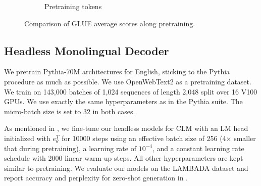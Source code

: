 \begin{figure}
\begin{subfigure}[b]{0.48\columnwidth}
         \caption{Pretraining tokens}
         \label{fig:bert_compare_tokens}
    \end{subfigure}
    \caption{Comparison of GLUE average scores along pretraining.}
    \label{fig:train_curve_mlm}
\end{figure}



\subsection{Headless Monolingual Decoder}
\label{sec:mono_decoder}
We pretrain Pythia-70M architectures for English, sticking to the Pythia procedure \citep{biderman2023pythia} as much as possible. We use OpenWebText2 as a pretraining dataset. We train on 143,000 batches of 1,024 sequences of length 2,048 split over 16 V100 GPUs. We use exactly the same hyperparameters as in the Pythia suite. The micro-batch size is set to 32 in both cases.

%
As mentioned in , we fine-tune our headless models for CLM with an LM head initialized with $e_{\theta}^T$ for 10000 steps using an effective batch size of 256 (4$\times$ smaller that during pretraining), a learning rate of $10^{-4}$, and a constant learning rate schedule with 2000 linear warm-up steps. All other hyperparameters are kept similar to pretraining. We evaluate our models on the LAMBADA dataset and report accuracy and perplexity for zero-shot generation in .

